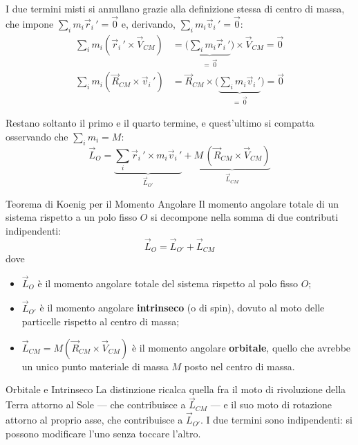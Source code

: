 I due termini misti si annullano grazie alla definizione stessa di centro di massa, che impone $\sum_i m_i \vec{r}_i\,' = \vec{0}$ e, derivando, $\sum_i m_i \vec{v}_i\,' = \vec{0}$:
\begin{align}
    \sum_i m_i (\vec{r}_i\,' \times \vec{V}_{CM})
    &= \Big(\underbrace{\textstyle\sum_i m_i \vec{r}_i\,'}_{=\,\vec{0}}\Big) \times \vec{V}_{CM} = \vec{0} \\
    \sum_i m_i (\vec{R}_{CM} \times \vec{v}_i\,')
    &= \vec{R}_{CM} \times \Big(\underbrace{\textstyle\sum_i m_i \vec{v}_i\,'}_{=\,\vec{0}}\Big) = \vec{0}
\end{align}

Restano soltanto il primo e il quarto termine, e quest'ultimo si compatta osservando che $\sum_i m_i = M$:
\begin{equation}
    \vec{L}_O = \underbrace{\sum_i \vec{r}_i\,' \times m_i \vec{v}_i\,'}_{\vec{L}_{O'}}
    + \underbrace{M \,(\vec{R}_{CM} \times \vec{V}_{CM})}_{\vec{L}_{CM}}
\end{equation}

\begin{teorema}{Teorema di Koenig per il Momento Angolare}
Il momento angolare totale di un sistema rispetto a un polo fisso $O$ si decompone nella somma di due contributi indipendenti:
\begin{equation}
    \vec{L}_O = \vec{L}_{O'} + \vec{L}_{CM}
\end{equation}
dove
\begin{itemize}[leftmargin=1.4em]
    \item $\vec{L}_O$ è il momento angolare totale del sistema rispetto al polo fisso $O$;
    \item $\vec{L}_{O'}$ è il momento angolare \textbf{intrinseco} (o di spin), dovuto al moto delle particelle rispetto al centro di massa;
    \item $\vec{L}_{CM} = M(\vec{R}_{CM} \times \vec{V}_{CM})$ è il momento angolare \textbf{orbitale}, quello che avrebbe un unico punto materiale di massa $M$ posto nel centro di massa.
\end{itemize}
\end{teorema}

\begin{osservazione}{Orbitale e Intrinseco}
La distinzione ricalca quella fra il moto di rivoluzione della Terra attorno al Sole --- che contribuisce a $\vec{L}_{CM}$ --- e il suo moto di rotazione attorno al proprio asse, che contribuisce a $\vec{L}_{O'}$. I due termini sono indipendenti: si possono modificare l'uno senza toccare l'altro.
\end{osservazione}

